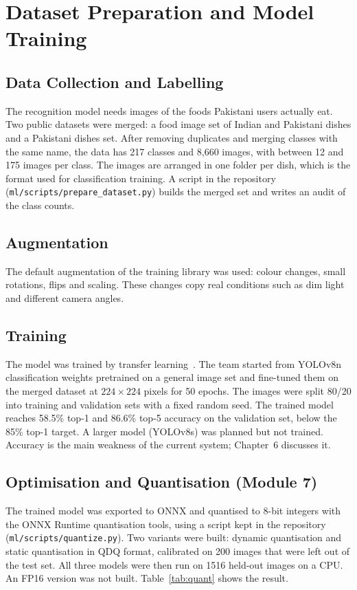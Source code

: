 \section{Dataset Preparation and Model Training}
\subsection{Data Collection and Labelling}
The recognition model needs images of the foods Pakistani users actually eat. Two public datasets were
merged: a food image set of Indian and Pakistani dishes and a Pakistani dishes set. After removing
duplicates and merging classes with the same name, the data has 217 classes and 8{,}660 images, with
between 12 and 175 images per class. The images are arranged in one folder per dish, which is the format
used for classification training. A script in the repository (\texttt{ml/scripts/prepare\_dataset.py})
builds the merged set and writes an audit of the class counts.

\subsection{Augmentation}
The default augmentation of the training library was used: colour changes, small rotations, flips and
scaling. These changes copy real conditions such as dim light and different camera angles.

\subsection{Training}
The model was trained by transfer learning~\cite{yolo_ult}. The team started from YOLOv8n classification
weights pretrained on a general image set and fine-tuned them on the merged dataset at $224\times224$ pixels
for 50 epochs. The images were split 80/20 into training and validation sets with a fixed random seed. The
trained model reaches 58.5\% top-1 and 86.6\% top-5 accuracy on the validation set, below the 85\% top-1 target.
A larger model (YOLOv8s) was planned but not trained. Accuracy is the main weakness of the current system;
Chapter~6 discusses it.

\subsection{Optimisation and Quantisation (Module 7)}
The trained model was exported to ONNX and quantised to 8-bit integers with the ONNX Runtime quantisation
tools, using a script kept in the repository (\texttt{ml/scripts/quantize.py}). Two variants were built:
dynamic quantisation and static quantisation in QDQ format, calibrated on 200 images that were left out of the
test set. All three models were then run on 1516 held-out images on a CPU. An FP16 version was not built.
Table~\ref{tab:quant} shows the result.

